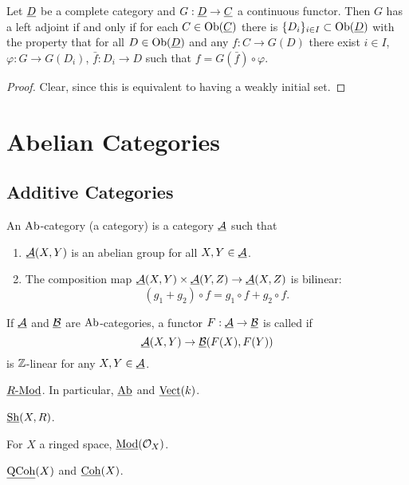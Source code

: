 \begin{theorem*}
	Let \( \underline{D} \) be a complete category and \( G: \underline{D} \to \underline{C} \) a continuous functor. Then \( G \) has a left adjoint if and only if for each \( C \in \operatorname{Ob}(\underline{C}) \) there is \( \{D_i\}_{i \in I} \subset \operatorname{Ob}(\underline{D}) \) with the property that for all \( D \in \operatorname{Ob}(\underline{D}) \) and any \( f: C \to G(D) \) there exist \( i \in I \), \( \varphi: G \to G(D_i) \), \( \bar{f}: D_i \to D \) such that \( f = G(\bar{f}) \circ \varphi \).
\end{theorem*}
\begin{proof}
	Clear, since this is equivalent to having a weakly initial set.
\end{proof}

\chapter{Abelian Categories}

\section{Additive Categories}

\begin{definitions*}
	\item An \( \mathrm{Ab} \)-category (a  category) is a category \( \underline{\mathcal A} \) such that
		\begin{enumerate}
			\item \( \underline{\mathcal A}(X, Y) \) is an abelian group for all \( X, Y \in \underline{\mathcal A} \).
			\item The composition map \( \underline{\mathcal A}(X, Y) \times \underline{\mathcal A}(Y, Z) \to \underline{\mathcal A}(X, Z) \) is bilinear:
				\[
					(g_1 + g_2) \circ f = g_1 \circ f + g_2 \circ f.
				\]
		\end{enumerate}
	\item If \( \underline{\mathcal A} \) and \( \underline{\mathcal B} \) are \( \mathrm{Ab} \)-categories, a functor \( F: \underline{\mathcal A} \to \underline{\mathcal B} \) is called  if
		\[
			\underline{\mathcal A}(X, Y) \to \underline{\mathcal B}(F(X), F(Y))
		\]
		is \( \mathbb{Z} \)-linear for any \( X, Y \in \underline{\mathcal A} \).
\end{definitions*}

\begin{examples*}
	\item \( \underline{R\text{-}\mathrm{Mod}} \). In particular, \( \underline{\mathrm{Ab}} \) and \( \operatorname{\underline{\mathrm{Vect}}}(k) \).
	\item \( \operatorname{\underline{\mathrm{Sh}}}(X, R) \).
	\item For \( X \) a ringed space, \( \operatorname{\underline{\mathrm{Mod}}}(\mathcal{O}_X) \).
	\item \( \operatorname{\underline{\mathrm{QCoh}}}(X) \) and \( \operatorname{\underline{\mathrm{Coh}}}(X) \).
\end{examples*}

